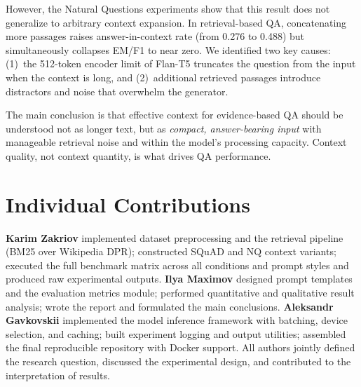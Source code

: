 \documentclass[a4paper,12pt]{article}
\begin{document}
However, the Natural Questions experiments show that this result does not generalize to arbitrary context expansion. In retrieval-based QA, concatenating more passages raises answer-in-context rate (from 0.276 to 0.488) but simultaneously collapses EM/F1 to near zero. We identified two key causes: (1)~the 512-token encoder limit of Flan-T5 truncates the question from the input when the context is long, and (2)~additional retrieved passages introduce distractors and noise that overwhelm the generator.

The main conclusion is that effective context for evidence-based QA should be understood not as longer text, but as \emph{compact, answer-bearing input} with manageable retrieval noise and within the model's processing capacity. Context quality, not context quantity, is what drives QA performance.

\section*{Individual Contributions}
\textbf{Karim Zakriov} implemented dataset preprocessing and the retrieval pipeline (BM25 over Wikipedia DPR); constructed SQuAD and NQ context variants; executed the full benchmark matrix across all conditions and prompt styles and produced raw experimental outputs.
\textbf{Ilya Maximov} designed prompt templates and the evaluation metrics module; performed quantitative and qualitative result analysis; wrote the report and formulated the main conclusions.
\textbf{Aleksandr Gavkovskii} implemented the model inference framework with batching, device selection, and caching; built experiment logging and output utilities; assembled the final reproducible repository with Docker support.
All authors jointly defined the research question, discussed the experimental design, and contributed to the interpretation of results.
\end{document}
